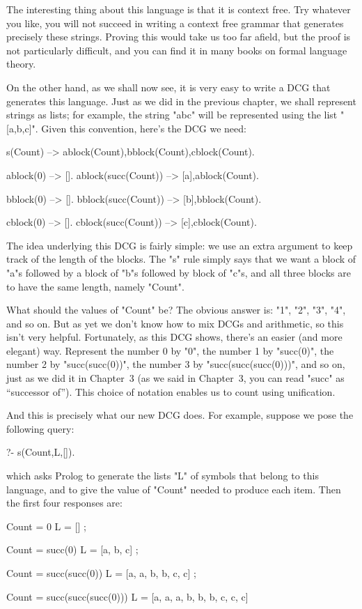 The interesting thing about this language is that it is 
context free. Try whatever you like, you will not succeed in writing a
context free grammar that generates precisely these strings. Proving
this would take us too far afield, but the proof is not particularly
difficult, and you can find it in many books on formal language
theory.

 On the other hand, as we shall now see, it is very easy to write a
DCG that generates this language. Just as we did in the previous
chapter, we shall represent strings as lists; for example, the string
"abc" will be represented using the list "[a,b,c]". Given this
convention, here's the DCG we need:
\begin{LPNcodedisplay}
s(Count) --> ablock(Count),bblock(Count),cblock(Count).

ablock(0) --> [].
ablock(succ(Count)) --> [a],ablock(Count).

bblock(0) --> [].
bblock(succ(Count)) --> [b],bblock(Count).

cblock(0) --> [].
cblock(succ(Count)) --> [c],cblock(Count).
\end{LPNcodedisplay}


The idea underlying this DCG is fairly simple: we use an extra
argument to keep track of the length of the blocks. The "s" rule
simply says that we want a block of "a"s followed by a block of
"b"s followed by block of "c"s, and all three blocks are to
have the same length, namely "Count".

What should the values of "Count" be? The obvious answer is: "1", "2",
"3", "4", and so on.  But as yet we don't know how to mix DCGs and
arithmetic, so this isn't very helpful. Fortunately, as this DCG
shows, there's an easier (and more elegant) way. Represent the
number 0 by "0", the number 1 by "succ(0)", the number 2 by
"succ(succ(0))", the number 3 by "succ(succ(succ(0)))", and so on,
just as we did it in Chapter~3 (as we said in Chapter~3, you can read
"succ" as ``successor of'').  This choice of notation
enables us to count using unification.

And this is precisely what our new  DCG does.
For example, suppose we pose the following query:
\begin{LPNcodedisplay}
?- s(Count,L,[]).
\end{LPNcodedisplay}
which asks Prolog to generate the lists "L" of symbols that
belong to this language, and to give the value of "Count" needed
to produce each item. Then the first four responses are:
\begin{LPNcodedisplay}
Count = 0
L = [] ;

Count = succ(0)
L = [a, b, c] ;

Count = succ(succ(0))
L = [a, a, b, b, c, c] ;

Count = succ(succ(succ(0)))
L = [a, a, a, b, b, b, c, c, c]
\end{LPNcodedisplay}

